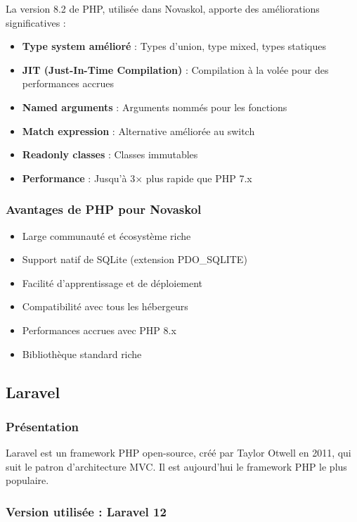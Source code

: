 \documentclass[12pt,a4paper,twoside]{report}
\begin{document}
La version 8.2 de PHP, utilisée dans Novaskol, apporte des améliorations significatives :
\begin{itemize}
    \item \textbf{Type system amélioré} : Types d'union, type mixed, types statiques
    \item \textbf{JIT (Just-In-Time Compilation)} : Compilation à la volée pour des performances accrues
    \item \textbf{Named arguments} : Arguments nommés pour les fonctions
    \item \textbf{Match expression} : Alternative améliorée au switch
    \item \textbf{Readonly classes} : Classes immutables
    \item \textbf{Performance} : Jusqu'à 3$\times$ plus rapide que PHP 7.x
\end{itemize}

\subsubsection{Avantages de PHP pour Novaskol}

\begin{itemize}
    \item Large communauté et écosystème riche
    \item Support natif de SQLite (extension PDO\_SQLITE)
    \item Facilité d'apprentissage et de déploiement
    \item Compatibilité avec tous les hébergeurs
    \item Performances accrues avec PHP 8.x
    \item Bibliothèque standard riche
\end{itemize}

\subsection{Laravel}

\subsubsection{Présentation}

Laravel est un framework PHP open-source, créé par Taylor Otwell en 2011, qui suit le patron d'architecture MVC. Il est aujourd'hui le framework PHP le plus populaire.

\subsubsection{Version utilisée : Laravel 12}
\end{document}
